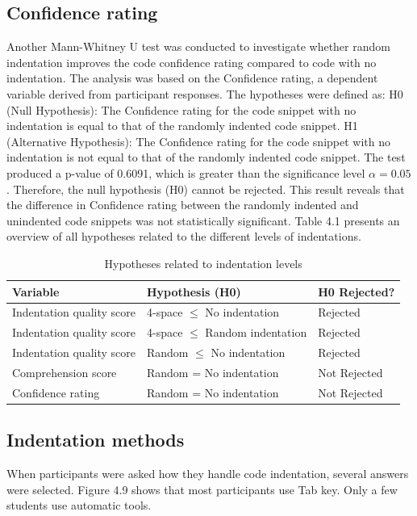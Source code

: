 \subsection{Confidence rating}

Another Mann-Whitney U test was conducted to investigate whether random indentation improves the code confidence rating compared to code with no indentation. The analysis was based on the Confidence rating, a dependent variable derived from participant responses. The hypotheses were defined as: H0 (Null Hypothesis): The Confidence rating for the code snippet with no indentation is equal to that of the randomly indented code snippet. H1 (Alternative Hypothesis): The Confidence rating for the code snippet with no indentation is not equal to that of the randomly indented code snippet.
The test produced a p-value of 0.6091, which is greater than the significance level \(\alpha = 0.05\). Therefore, the null hypothesis (H0) cannot be rejected. This result reveals that the difference in Confidence rating between the randomly indented and unindented code snippets was not statistically significant.  Table 4.1 presents an overview of all hypotheses related to the different levels of indentations. 
\begin{table}[ht]
\centering
\small
\begin{tabular}{|p{5cm}|p{6cm}|p{2.5cm}|}
\hline
\rule{0pt}{1.2em}\textbf{Variable} & \textbf{Hypothesis (H0)} & \textbf{H0 Rejected?} \\[0.5em]
\hline
\rule{0pt}{1.2em}Indentation quality score & 4-space $\leq$ No indentation & Rejected \\[0.5em]
\hline
\rule{0pt}{1.2em}Indentation quality score & 4-space $\leq$ Random indentation & Rejected \\[0.5em]
\hline
\rule{0pt}{1.2em}Indentation quality score & Random $\leq$ No indentation & Rejected \\[0.5em]
\hline
\rule{0pt}{1.2em}Comprehension score & Random = No indentation & Not Rejected \\[0.5em]
\hline
\rule{0pt}{1.2em}Confidence rating & Random = No indentation & Not Rejected \\[0.5em]
\hline
\end{tabular}
\caption{Hypotheses related to indentation levels}
\end{table}


\subsection{Indentation methods}
When participants were asked how they handle code indentation, several answers were selected. Figure 4.9 shows that most participants use Tab key. Only a few students use automatic tools.  

